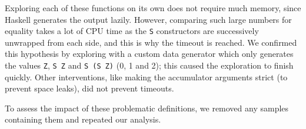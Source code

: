 Exploring each of these functions on its own does not require much memory, since
Haskell generates the output lazily. However, comparing such large numbers for
equality takes a lot of CPU time as the \texttt{S} constructors are successively
unwrapped from each side, and this is why the timeout is reached. We confirmed
this hypothesis by exploring with a custom data generator which only generates
the values \texttt{Z}, \texttt{S Z} and \texttt{S (S Z)} (0, 1 and 2); this
caused the exploration to finish quickly. Other interventions, like making the
accumulator arguments strict (to prevent space leaks), did not prevent timeouts.

To assess the impact of these problematic definitions, we removed any samples
containing them and repeated our analysis.
